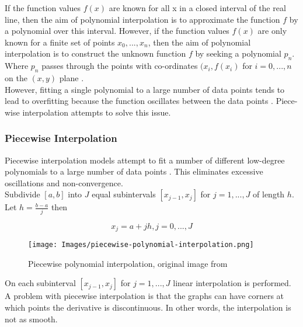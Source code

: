 If the function values $f(x)$ are known for all x  in a closed interval of the real line, then the aim of polynomial interpolation is to approximate the function $f$ by a polynomial over this interval. However, if the function values $f(x)$ are only known for a finite set of points $x_0, ..., x_n$, then the aim of polynomial interpolation is to construct the unknown function $f$ by seeking a polynomial $p_n$. Where $p_n$ passes through the points with co-ordinates $(x_i, f(x_i)$ for $i = 0, ..., n$ on the $(x, y)$ plane \cite{intro-to-numerical-analysis-suli}. \\

However, fitting a single polynomial to a large number of data points tends to lead to overfitting because the function oscillates between the data points \cite{intro-to-numerical-analysis-atkinson}. Piece-wise interpolation attempts to solve this issue. 

\subsubsection{Piecewise Interpolation}

Piecewise interpolation models attempt to fit a number of different low-degree polynomials to a large number of data points \cite{intro-to-numerical-analysis-atkinson}. This eliminates excessive oscillations and non-convergence.\\

Subdivide $[a, b]$ into $J$ equal subintervals $[x_{j-1}, x_j]$ for $j = 1, ..., J$ of length $h$. Let $h = \frac{b-a}{j}$ then 

\begin{equation}
    x_j = a + jh, j = 0, ..., J
\end{equation}

\begin{figure}[H]
\begin{center}
    \texttt{[image: Images/piecewise-polynomial-interpolation.png]}
    \caption{Piecewise polynomial interpolation, original image from \cite{m2aa3-notes}}
    \label{fig:piecewise-polynomial-interpolation}
\end{center}
\end{figure}

On each subinterval $[x_{j-1}, x_j]$ for $j = 1,...,J$ linear interpolation is performed. \\

A problem with piecewise interpolation is that the graphs can have corners at which points the derivative is discontinuous. In other words, the interpolation is not as smooth.

